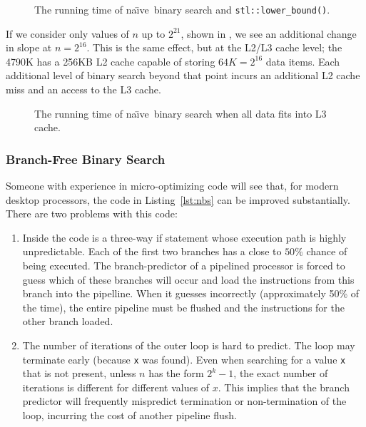 \documentclass{patmorin}
\newcommand{\lstref}[1]{Listing~\ref{lst:#1}}
\newcommand{\naive}{na\"{\i}ve}
\begin{document}
\begin{figure}
   \caption{The running time of \naive\ binary search and \texttt{stl::lower_bound()}.}
\end{figure}

If we consider only values of $n$ up to $2^{21}$, shown in
, we see an additional change in slope at
$n=2^{16}$.  This is the same effect, but at the L2/L3 cache level; the
4790K has a 256KB L2 cache capable of storing $64K=2^{16}$ data items.
Each additional level of binary search beyond that point incurs an
additional L2 cache miss and an access to the L3 cache.

\begin{figure}
   \caption{The running time of \naive\ binary search when all data
    fits into L3 cache.}
\end{figure}


\subsubsection{Branch-Free Binary Search}

Someone with experience in micro-optimizing code will see that, for
modern desktop processors, the code in \lstref{nbs} can be improved
substantially.  There are two problems with this code:

\begin{enumerate}

\item Inside the code is a three-way if statement whose execution path
is highly unpredictable. Each of the first two branches has a close to
$50\%$ chance of being executed.  The branch-predictor of a pipelined
processor is forced to guess which of these branches will occur and load
the instructions from this branch into the pipelline.  When it guesses
incorrectly (approximately 50\% of the time), the entire pipeline must be
flushed and the instructions for the other branch loaded.

\item The number of iterations of the outer loop is hard to predict. The
loop may terminate early (because \texttt{x} was found). Even when
searching for a value \texttt{x} that is not present, unless $n$ has
the form $2^k-1$, the exact number of iterations is different for different
values of $x$.  This implies that the branch predictor will frequently
mispredict termination or non-termination of the loop, incurring the
cost of another pipeline flush.

\end{enumerate}
\end{document}
